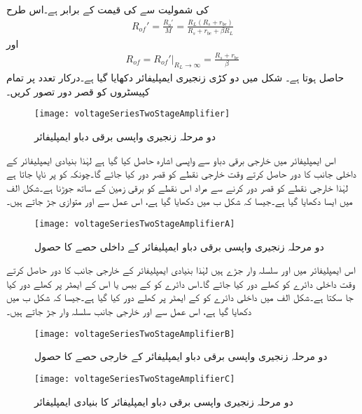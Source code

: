  کی شمولیت سے  کی قیمت  کے برابر ہے۔اس طرح
\begin{align}
R_{of}'=\frac{R_o'}{M}=\frac{R_L(R_s+r_{be})}{R_s+r_{be}+\beta R_L}
\end{align}
اور
\begin{align}
R_{of}=\left. R_{of}'\right|_{R_L \to \infty} =\frac{R_s+r_{be}}{\beta}
\end{align}
حاصل ہوتا ہے۔
%
شکل  میں دو کڑی زنجیری ایمپلیفائر دکھایا گیا  ہے۔درکار تعدد پر تمام کپیسٹروں کو قصر دور تصور کریں۔
\begin{figure}
\centering
\texttt{[image: voltageSeriesTwoStageAmplifier]}
\caption{دو مرحلہ زنجیری واپسی برقی دباو ایمپلیفائر}
\label{شکل_واپسی_دو_درجہ_واپسی_برقی_دباو_ایمپلیفائر}
\end{figure}
اس ایمپلیفائر میں خارجی برقی دباو  سے واپسی اشارہ  حاصل کیا گیا ہے لہٰذا بنیادی ایمپلیفائر کے داخلی جانب کا دور حاصل کرتے وقت خارجی نقطے  کو قصر دور کیا جائے گا۔چونکہ  کو   پر ناپا جاتا ہے لہٰذا خارجی نقطے  کو قصر دور کرنے سے مراد اس نقطے  کو برقی زمین کے ساتھ جوڑنا ہے۔شکل  الف میں ایسا دکھایا گیا ہے۔جیسا کہ شکل  ب میں دکھایا گیا ہے، اس عمل سے  اور  متوازی جڑ جاتے ہیں۔
\begin{figure}
\centering
\texttt{[image: voltageSeriesTwoStageAmplifierA]}
\caption{دو مرحلہ زنجیری واپسی برقی دباو ایمپلیفائر کے داخلی حصے کا حصول}
\label{شکل_واپسی_دو_درجہ_واپسی_برقی_دباو_ایمپلیفائر_داخلی_حصہ}
\end{figure}
اس ایمپلیفائر میں  اور  سلسلہ وار جڑے ہیں لہٰذا بنیادی ایمپلیفائر کے خارجی جانب کا دور حاصل کرتے وقت داخلی دائرے کو کھلے دور کیا جائے گا۔اس دائرے کو  کے بیس یا اس کے ایمٹر پر کھلے دور کیا جا سکتا ہے۔شکل  الف  میں داخلی دائرے کو  کے ایمٹر پر کھلے دور کیا گیا ہے۔جیسا کہ شکل  ب میں دکھایا گیا ہے، اس عمل سے  اور  خارجی جانب سلسلہ وار جڑ جاتے ہیں۔
\begin{figure}
\centering
\texttt{[image: voltageSeriesTwoStageAmplifierB]}
\caption{دو مرحلہ زنجیری واپسی برقی دباو ایمپلیفائر کے خارجی حصے کا حصول}
\label{شکل_واپسی_دو_درجہ_واپسی_برقی_دباو_ایمپلیفائر_خارجی_حصہ}
\end{figure}
%
\begin{figure}
\centering
\texttt{[image: voltageSeriesTwoStageAmplifierC]}
\caption{دو مرحلہ زنجیری واپسی برقی دباو ایمپلیفائر کا بنیادی ایمپلیفائر}
\label{شکل_واپسی_دو_درجہ_واپسی_برقی_دباو_ایمپلیفائر_بنیادی}
\end{figure}
